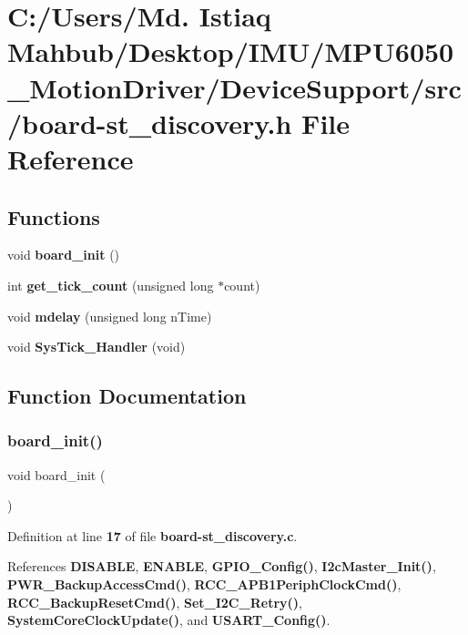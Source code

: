 \section{C\+:/\+Users/\+Md. Istiaq Mahbub/\+Desktop/\+I\+M\+U/\+M\+P\+U6050\+\_\+\+Motion\+Driver/\+Device\+Support/src/board-\/st\+\_\+discovery.h File Reference}
\label{board-st__discovery_8h}
\subsection*{Functions}
\begin{DoxyCompactItemize}
\item 
void \textbf{ board\+\_\+init} ()
\item 
int \textbf{ get\+\_\+tick\+\_\+count} (unsigned long $\ast$count)
\item 
void \textbf{ mdelay} (unsigned long n\+Time)
\item 
void \textbf{ Sys\+Tick\+\_\+\+Handler} (void)
\end{DoxyCompactItemize}


\subsection{Function Documentation}
\mbox{\label{board-st__discovery_8h_ad7d81512b0ce3a7214547801a3e41264}} 
\subsubsection{board\+\_\+init()}
{\footnotesize\ttfamily void board\+\_\+init (\begin{DoxyParamCaption}{ }\end{DoxyParamCaption})}



Definition at line \textbf{ 17} of file \textbf{ board-\/st\+\_\+discovery.\+c}.



References \textbf{ D\+I\+S\+A\+B\+LE}, \textbf{ E\+N\+A\+B\+LE}, \textbf{ G\+P\+I\+O\+\_\+\+Config()}, \textbf{ I2c\+Master\+\_\+\+Init()}, \textbf{ P\+W\+R\+\_\+\+Backup\+Access\+Cmd()}, \textbf{ R\+C\+C\+\_\+\+A\+P\+B1\+Periph\+Clock\+Cmd()}, \textbf{ R\+C\+C\+\_\+\+Backup\+Reset\+Cmd()}, \textbf{ Set\+\_\+\+I2\+C\+\_\+\+Retry()}, \textbf{ System\+Core\+Clock\+Update()}, and \textbf{ U\+S\+A\+R\+T\+\_\+\+Config()}.



